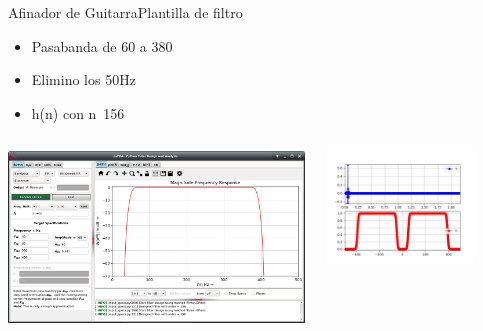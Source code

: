 \begin{frame}[t]{Afinador de Guitarra}{Plantilla de filtro}
      \footnotesize
         \begin{itemize}
            \item{Pasabanda de 60 a 380}
            \item{Elimino los 50Hz}
            \item{h(n) con n~156}
         \end{itemize}
         \begin{columns}
            \begin{column}{.5\textwidth}
               \includegraphics[width=1.0\textwidth]{7_clase/filter_template}
            \end{column}
            \begin{column}{.5\textwidth}
               \includegraphics[width=0.8\textwidth]{7_clase/fir_to_c}
            \end{column}
         \end{columns}
   \vfill
   \note{
      \begin{itemize}
         \item{}
         \item{}
      \end{itemize}
   }
\end{frame}

